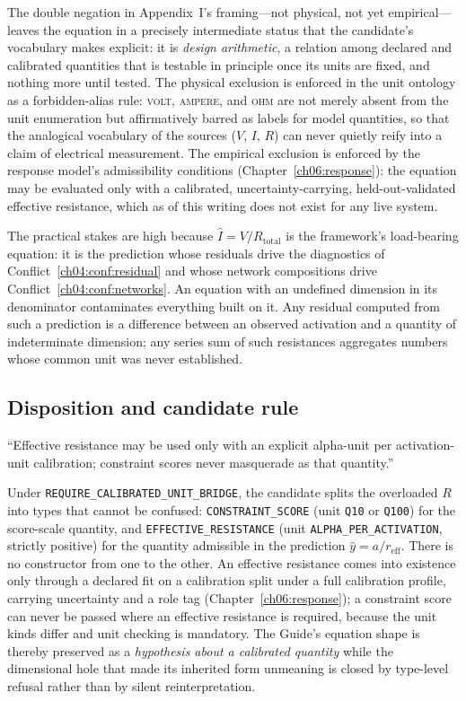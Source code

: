 The double negation in Appendix~I's framing---not physical, not yet
empirical---leaves the equation in a precisely intermediate status that the
candidate's vocabulary makes explicit: it is \emph{design arithmetic}, a
relation among declared and calibrated quantities that is testable in
principle once its units are fixed, and nothing more until tested. The
physical exclusion is enforced in the unit ontology as a forbidden-alias
rule: \textsc{volt}, \textsc{ampere}, and \textsc{ohm} are not merely absent
from the unit enumeration but affirmatively barred as labels for model
quantities, so that the analogical vocabulary of the sources ($V$, $I$, $R$)
can never quietly reify into a claim of electrical measurement. The
empirical exclusion is enforced by the response model's admissibility
conditions (Chapter~\ref{ch06:response}): the equation may be evaluated only
with a calibrated, uncertainty-carrying, held-out-validated effective
resistance, which as of this writing does not exist for any live system.

The practical stakes are high because $\hat I = V/R_{\mathrm{total}}$ is the
framework's load-bearing equation: it is the prediction whose residuals drive
the diagnostics of Conflict~\ref{ch04:conf:residual} and whose network
compositions drive Conflict~\ref{ch04:conf:networks}. An equation with an
undefined dimension in its denominator contaminates everything built on it.
Any residual computed from such a prediction is a difference between an
observed activation and a quantity of indeterminate dimension; any series sum
of such resistances aggregates numbers whose common unit was never
established.

\subsection{Disposition and candidate rule}

\begin{ruleenv}\label{ch04:rule:bridge}
``Effective resistance may be used only with an explicit alpha-unit per
activation-unit calibration; constraint scores never masquerade as that
quantity.''
\end{ruleenv}

Under \texttt{REQUIRE\_CALIBRATED\_UNIT\_BRIDGE}, the candidate splits the
overloaded $R$ into types that cannot be confused: \texttt{CONSTRAINT\_SCORE}
(unit \texttt{Q10} or \texttt{Q100}) for the score-scale quantity, and
\texttt{EFFECTIVE\_RESISTANCE} (unit \texttt{ALPHA\_PER\_ACTIVATION},
strictly positive) for the quantity admissible in the prediction
$\hat y = a/r_{\mathrm{eff}}$. There is no constructor from one to the other.
An effective resistance comes into existence only through a declared fit on a
calibration split under a full calibration profile, carrying uncertainty and
a role tag (Chapter~\ref{ch06:response}); a constraint score can never be
passed where an effective resistance is required, because the unit kinds
differ and unit checking is mandatory. The Guide's equation shape is thereby
preserved as a \emph{hypothesis about a calibrated quantity} while the
dimensional hole that made its inherited form unmeaning is closed by
type-level refusal rather than by silent reinterpretation.

